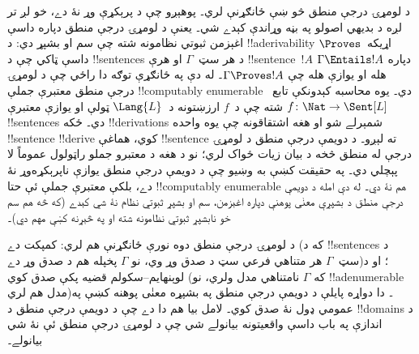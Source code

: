 \documentclass[../../../include/open-logic-section]{subfiles}
\begin{document}


د لومړۍ درجې منطق څو ښې ځانګړنې لري۔ پوهېږو چې د پرېکړې وړ نۀ دے،
خو لږ تر لږه د بديهي اصولو په بڼه وړاندې کېدے شي۔ يعنې د لومړۍ درجې
منطق دپاره داسې اغېزمن ثبوتي نظامونه شته چې سم او بشپړ دي: د !!a{derivability}
اړيکه~$\Proves$ داسې ټاکي چې د !!{sentence}s د هر سټ~$\Gamma$ او هرې
!!{sentence}~$!A$
دپاره $\Gamma \Entails !A$ هله او يوازې هله چې $\Gamma \Proves !A$۔
له دې په ځانګړې توګه دا راځي چې د لومړۍ درجې منطق معتبرې جملې
!!{computably
  enumerable} دي۔ يوه محاسبه کېدونکې تابع~$f\colon \Nat \to
\Sent[L]$ شته چې د~$f$ ارزښتونه د~$\Lang{L}$ ټولې او يوازې معتبرې
!!{sentence}s دي۔ ځکه !!{derivation}s شمېرلے شو او هغه اشتقاقونه چې يوه
واحده !!{sentence} !!{derive} کوي، هماغې !!{sentence} ته لېږو۔ د دويمې درجې منطق
د لومړۍ درجې له منطق څخه د بيان زيات ځواک لري؛ نو د هغه د معتبرو
جملو راټولول عموماً لا پېچلي دي۔ په حقيقت کښې به وښيو چې د دويمې
درجې منطق يوازې ناپرېکړه‌وړ نۀ دے، بلکې معتبرې جملې ئې حتا
!!{computably
  enumerable} هم نۀ دي۔ له دې امله د دويمې درجې منطق
د بشپړې معنٰی پوهنې دپاره اغېزمن، سم او بشپړ ثبوتي نظام نۀ شي کېدے (که څه هم سم خو نابشپړ
ثبوتي نظامونه شته او په څېړنه کښې مهم دي)۔

د لومړۍ درجې منطق دوه نورې ځانګړنې هم لري: کمپکت دے (که د !!{sentence}s
د سټ~$\Gamma$ هر متناهي فرعي سټ د صدق وړ وي، نو $\Gamma$ پخپله هم
د صدق وړ دے)؛ او د لوېنهايم--سکولم قضيه پکې صدق کوي (که $\Gamma$
نامتناهي مدل ولري، نو !!a{denumerable} مدل هم لري)۔ دا دواړه پايلې
د دويمې درجې منطق په بشپړه معنٰی پوهنه کښې په عمومي ډول نۀ صدق کوي۔ لامل بيا هم دا دے چې د دويمې درجې
منطق د !!{domain}s د اندازې په باب داسې واقعيتونه بيانولے شي چې د
لومړۍ درجې منطق ئې نۀ شي بيانولے۔
\end{document}
